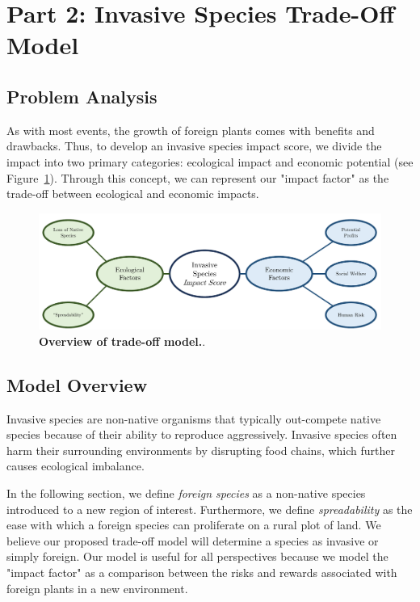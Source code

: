 \section{Part 2: Invasive Species Trade-Off Model}

\subsection{Problem Analysis}
As with most events, the growth of foreign plants comes with benefits and drawbacks. Thus, to develop an invasive species impact score, we divide the impact into two primary categories: ecological impact and economic potential (see Figure~\ref{fig:invasiveimpactbrainstorm}). Through this concept, we can represent our "impact factor" as the trade-off between ecological and economic impacts. 

\begin{figure}[h!]
\centering
    \includegraphics[scale=0.5]{figures/invasivespeciesimpactscore.pdf}
    \captionsetup{width=0.9\textwidth}
    \caption{\textbf{Overview of trade-off model.}.}
    \label{fig:invasiveimpactbrainstorm}
\end{figure}

\subsection{Model Overview}

Invasive species are non-native organisms that typically out-compete native species because of their ability to reproduce aggressively. Invasive species often harm their surrounding environments by disrupting food chains, which further causes ecological imbalance. 

In the following section, we define \textit{foreign species} as a non-native species introduced to a new region of interest. Furthermore, we define \textit{spreadability} as the ease with which a foreign species can proliferate on a rural plot of land. We believe our proposed trade-off model will determine a species as invasive or simply foreign. Our model is useful for all perspectives because we model the "impact factor" as a comparison between the risks and rewards associated with foreign plants in a new environment. 



